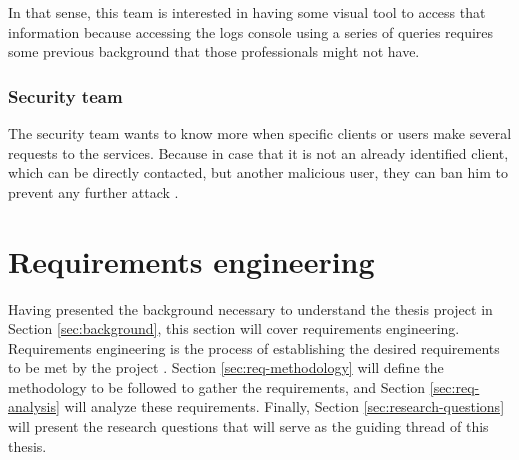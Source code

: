 \documentclass[english, 12pt, a4paper, sci, utf8, a-1b, online]{aaltothesis}
\begin{document}
In that sense, this team is interested in having some visual tool to access that information because accessing the logs console using a series of queries requires some previous background that those professionals might not have.

\subsubsection*{Security team}

The security team wants to know more when specific clients or users make several requests to the services. Because in case that it is not an already identified client, which can be directly contacted, but another malicious user, they can ban him to prevent any further attack \cite{jhaveri2012attacks}.

\clearpage
\section{Requirements engineering}





Having presented the background necessary to understand the thesis project in Section \ref{sec:background}, this section will cover requirements engineering.\\

Requirements engineering is the process of establishing the desired requirements to be met by the project \cite{hay2003requirements}. Section \ref{sec:req-methodology} will define the methodology to be followed to gather the requirements, and Section \ref{sec:req-analysis} will analyze these requirements. Finally, Section \ref{sec:research-questions} will present the research questions that will serve as the guiding thread of this thesis.
\end{document}
